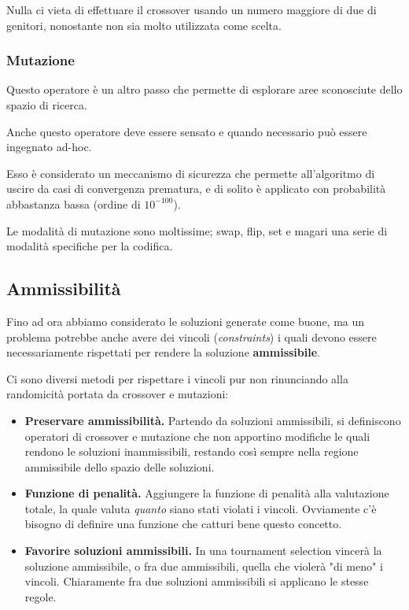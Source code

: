                 Nulla ci vieta di effettuare il crossover usando un numero maggiore di due di genitori, nonostante non sia molto utilizzata come scelta.
                
            \subsubsection{Mutazione}
                Questo operatore è un altro passo che permette di esplorare aree sconosciute dello spazio di ricerca.
                
                Anche questo operatore deve essere sensato e quando necessario può essere ingegnato ad-hoc.
                
                Esso è considerato un meccanismo di sicurezza che permette all'algoritmo di uscire da casi di convergenza prematura, e di solito è applicato con probabilità abbastanza bassa (ordine di $10^{-100}$).
                
                Le modalità di mutazione sono moltissime; swap, flip, set e magari una serie di modalità specifiche per la codifica.
                
        \subsection{Ammissibilità}
            Fino ad ora abbiamo considerato le soluzioni generate come buone, ma un problema potrebbe anche avere dei vincoli (\textit{constraints}) i quali devono essere necessariamente rispettati per rendere la soluzione \textbf{ammissibile}.
            
            Ci sono diversi metodi per rispettare i vincoli pur non rinunciando alla randomicità portata da crossover e mutazioni:
            \begin{itemize}
                \item \textbf{Preservare ammissibilità.} Partendo da soluzioni ammissibili, si definiscono operatori di crossover e mutazione che non apportino modifiche le quali rendono le soluzioni inammissibili, restando così sempre nella regione ammissibile dello spazio delle soluzioni.
                \item \textbf{Funzione di penalità.} Aggiungere la funzione di penalità alla valutazione totale, la quale valuta \textit{quanto} siano stati violati i vincoli. Ovviamente c'è bisogno di definire una funzione che catturi bene questo concetto.
                \item \textbf{Favorire soluzioni ammissibili.} In una tournament selection vincerà la soluzione ammissibile, o fra due ammissibili, quella che violerà "di meno" i vincoli. Chiaramente fra due soluzioni ammissibili si applicano le stesse regole.
            \end{itemize}
            
